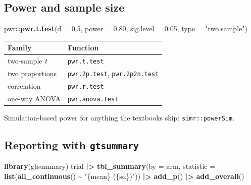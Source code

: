 \documentclass[
]{article}
\newenvironment{Shaded}{\begin{snugshade}}{\end{snugshade}}
\newcommand{\AttributeTok}[1]{\textcolor[rgb]{0.13,0.29,0.53}{#1}}
\newcommand{\FloatTok}[1]{\textcolor[rgb]{0.00,0.00,0.81}{#1}}
\newcommand{\FunctionTok}[1]{\textcolor[rgb]{0.13,0.29,0.53}{\textbf{#1}}}
\newcommand{\NormalTok}[1]{#1}
\newcommand{\SpecialCharTok}[1]{\textcolor[rgb]{0.81,0.36,0.00}{\textbf{#1}}}
\newcommand{\StringTok}[1]{\textcolor[rgb]{0.31,0.60,0.02}{#1}}
\newcounter{none} %
\begin{document}
\subsection{Power and sample size}\label{power-and-sample-size}

\begin{Shaded}
\begin{Highlighting}[]
\NormalTok{pwr}\SpecialCharTok{::}\FunctionTok{pwr.t.test}\NormalTok{(}\AttributeTok{d =} \FloatTok{0.5}\NormalTok{, }\AttributeTok{power =} \FloatTok{0.80}\NormalTok{, }\AttributeTok{sig.level =} \FloatTok{0.05}\NormalTok{,}
                \AttributeTok{type =} \StringTok{"two.sample"}\NormalTok{)}
\end{Highlighting}
\end{Shaded}

{\def\LTcaptype{none} %
\begin{longtable}[]{@{}ll@{}}
\toprule\noalign{}
Family & Function \\
\midrule\noalign{}
\endhead
\bottomrule\noalign{}
\endlastfoot
two-sample \emph{t} & \texttt{pwr.t.test} \\
two proportions & \texttt{pwr.2p.test}, \texttt{pwr.2p2n.test} \\
correlation & \texttt{pwr.r.test} \\
one-way ANOVA & \texttt{pwr.anova.test} \\
\end{longtable}
}

Simulation-based power for anything the textbooks skip:
\texttt{simr::powerSim}.

\subsection{\texorpdfstring{Reporting with
\texttt{gtsummary}}{Reporting with gtsummary}}\label{reporting-with-gtsummary}

\begin{Shaded}
\begin{Highlighting}[]
\FunctionTok{library}\NormalTok{(gtsummary)}
\NormalTok{trial }\SpecialCharTok{|\textgreater{}}
  \FunctionTok{tbl\_summary}\NormalTok{(}\AttributeTok{by =}\NormalTok{ arm, }\AttributeTok{statistic =} \FunctionTok{list}\NormalTok{(}\FunctionTok{all\_continuous}\NormalTok{() }\SpecialCharTok{\textasciitilde{}} \StringTok{"\{mean\} (\{sd\})"}\NormalTok{)) }\SpecialCharTok{|\textgreater{}}
  \FunctionTok{add\_p}\NormalTok{() }\SpecialCharTok{|\textgreater{}}
  \FunctionTok{add\_overall}\NormalTok{()}
\end{Highlighting}
\end{Shaded}
\end{document}
